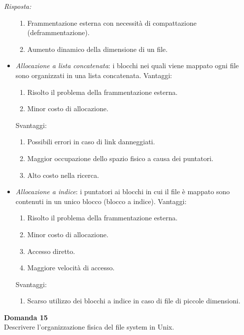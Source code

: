 \documentclass{article}
\newenvironment{problem}[2][Domanda]
    { \begin{mdframed}[backgroundcolor=gray!20] \textbf{#1 #2} \\}
    {  \end{mdframed}}
\newenvironment{solution}
    {\textit{Risposta:}}
    {}
\begin{document}
\begin{solution}
\begin{itemize}
\begin{enumerate}
        \item Frammentazione esterna con necessità di compattazione (deframmentazione).
        \item Aumento dinamico della dimensione di un file.
    \end{enumerate}
    \item \emph{Allocazione a lista concatenata}: i blocchi nei quali viene mappato ogni file sono organizzati in una lista concatenata.
    \newline
    \newline
  Vantaggi:
  \begin{enumerate}
      \item Risolto il problema della frammentazione esterna.
      \item Minor costo di allocazione.
  \end{enumerate}
  Svantaggi:
  \begin{enumerate}
      \item Possibili errori in caso di link danneggiati.
      \item Maggior occupazione dello spazio fisico a causa dei puntatori.
      \item Alto costo nella ricerca.
  \end{enumerate}
  \item \emph{Allocazione a indice}: i puntatori ai blocchi in cui il file è mappato sono contenuti in un unico blocco (blocco a indice).
  \newline
  \newline
  Vantaggi:
  \begin{enumerate}
      \item Risolto il problema della frammentazione esterna.
      \item Minor costo di allocazione.
      \item Accesso diretto.
      \item Maggiore velocità di accesso.
  \end{enumerate}
  Svantaggi:
  \begin{enumerate}
      \item Scarso utilizzo dei blocchi a indice in caso di file di piccole dimensioni.
  \end{enumerate}
\end{itemize}
\end{solution}
\begin{problem}{15}
Descrivere l'organizzazione fisica del file system in Unix.
\end{problem}
\end{document}
